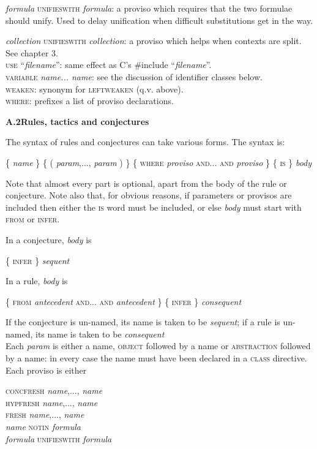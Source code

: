 \documentclass[11pt]{book}
\newcommand{\tab}{\hspace{5mm}}
\begin{document}
\textit{formula} \textsc{unifieswith} \textit{formula}: a proviso which requires that the two formulae should unify. Used to delay unification when difficult substitutions get in the way.


\textit{collection} \textsc{unifieswith} \textit{collection}: a proviso which helps when contexts are split. See chapter 3.\\
\textsc{use} ``\textit{filename}'': same effect as C's \#include ``\textit{filename}''.\\
\textsc{variable} \textit{name... name}: see the discussion of identifier classes below.\\
\textsc{weaken}: synonym for \textsc{leftweaken} (q.v. above).\\
\textsc{where}: prefixes a list of proviso declarations.


\textbf{{\large A.2\tab Rules, tactics and conjectures}}


The syntax of rules and conjectures can take various forms. The syntax is:


\{ \textit{name} \} \{ ( \textit{param},..., \textit{param} ) \} \{ \textsc{where} \textit{proviso} \textsc{and... and} \textit{proviso} \} \{ \textsc{is} \} \textit{body}


Note that almost every part is optional, apart from the body of the rule or conjecture. Note also that, for obvious reasons, if parameters or provisos are included then either the \textsc{is} word must be included, or else \textit{body} must start with \textsc{from} or \textsc{infer}.


In a conjecture, \textit{body} is


\{ \textsc{infer \}} \textit{sequent}


In a rule, \textit{body} is


\{ \textsc{from} \textit{antecedent} \textsc{and... and} \textit{antecedent} \} \{ \textsc{infer \}} \textit{consequent}


If the conjecture is un-named, its name is taken to be \textit{sequent}; if a rule is un-named, its name is taken to be \textit{consequent}\\
Each \textit{param} is either a name, \textsc{object} followed by a name or \textsc{abstraction} followed by a name: in every case the name must have been declared in a \textsc{class} directive. Each proviso is either

\textsc{concfresh} \textit{name},..., \textit{name}\\
\textsc{hypfresh} \textit{name},..., \textit{name}\\
\textsc{fresh} \textit{name},..., \textit{name}\\
\textit{name} \textsc{notin} \textit{formula}\\
\textit{formula} \textsc{unifieswith} \textit{formula}
\end{document}

